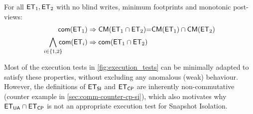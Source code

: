 \begin{theorem}[Compositionality]     
For all $\mathsf{ET}_1, \mathsf{ET}_2$ with no blind writes, minimum footprints and monotonic post-views: 
\begin{align*}
    \mathsf{com}(\mathsf{ET}_1)
    & \Rightarrow \mathsf{CM}(\mathsf{ET}_1 \cap \mathsf{ET}_2) {=} \mathsf{CM}(\mathsf{ET}_1) \cap \mathsf{CM}(\mathsf{ET}_2)\\
    \bigwedge_{i \in \{1, 2\}} \!\!\!\!\mathsf{com}(\mathsf{ET}_i)
    & \Rightarrow  \mathsf{com}(\mathsf{ET}_1 \cap \mathsf{ET}_2)
\end{align*}
\end{theorem}

Most of the execution tests in \cref{fig:execution_tests} can be minimally adapted to satisfy these 
properties, without excluding any anomalous (weak) behaviour. However, the definitions 
of $\mathsf{ET}_{\mathsf{SI}}$ and $\mathsf{ET}_{\mathsf{CP}}$ are inherently non-commutative (counter example in \cref{sec:comm-counter-cp-si}), which also motivates 
why $\mathsf{ET}_{\mathsf{UA}} \cap \mathsf{ET}_{\mathsf{CP}}$ is not an appropriate execution test for Snapshot Isolation.


